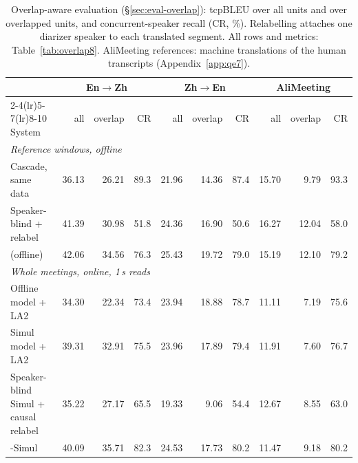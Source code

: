 \begin{table}[t]
\centering\small
\setlength{\tabcolsep}{4pt}
\begin{tabular}{lrrrrrrrrr}
\toprule
 & \multicolumn{3}{c}{En$\rightarrow$Zh} & \multicolumn{3}{c}{Zh$\rightarrow$En} & \multicolumn{3}{c}{AliMeeting} \\
\cmidrule(lr){2-4}\cmidrule(lr){5-7}\cmidrule(lr){8-10}
System & all & overlap & CR & all & overlap & CR & all & overlap & CR \\
\midrule
\multicolumn{10}{l}{\emph{Reference windows, offline}} \\
Cascade, same data & 36.13 & 26.21 & 89.3 & 21.96 & 14.36 & 87.4 & 15.70 & 9.79 & 93.3 \\
Speaker-blind + relabel & 41.39 & 30.98 & 51.8 & 24.36 & 16.90 & 50.6 & 16.27 & 12.04 & 58.0 \\
\sys{} (offline) & 42.06 & 34.56 & 76.3 & 25.43 & 19.72 & 79.0 & 15.19 & 12.10 & 79.2 \\
\multicolumn{10}{l}{\emph{Whole meetings, online, 1\,s reads}} \\
Offline model + LA2 & 34.30 & 22.34 & 73.4 & 23.94 & 18.88 & 78.7 & 11.11 & 7.19 & 75.6 \\
Simul model + LA2 & 39.31 & 32.91 & 75.5 & 23.96 & 17.89 & 79.4 & 11.91 & 7.60 & 76.7 \\
Speaker-blind Simul + causal relabel & 35.22 & 27.17 & 65.5 & 19.33 & 9.06 & 54.4 & 12.67 & 8.55 & 63.0 \\
\sys{}-Simul & 40.09 & 35.71 & 82.3 & 24.53 & 17.73 & 80.2 & 11.47 & 9.18 & 80.2 \\
\bottomrule
\end{tabular}
\caption{Overlap-aware evaluation (\S\ref{sec:eval-overlap}): tcpBLEU over all units and over overlapped units, and
concurrent-speaker recall (CR, \%). Relabelling attaches one diarizer speaker to each translated segment. All rows and
metrics: Table~\ref{tab:overlap8}. AliMeeting references: machine translations of the human transcripts (Appendix~\ref{app:qe7}).}
\label{tab:ovmain8}
\end{table}
